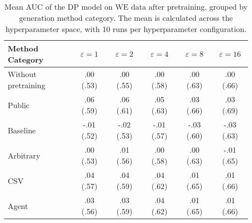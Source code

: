 \begin{table}[h!]
    \centering
    \caption{Mean AUC of the DP model on WE data after pretraining, grouped by generation method category. The mean is calculated across the hyperparameter space, with 10 runs per hyperparameter configuration.}
    \label{tab:epsilon_comparison}
    \begin{tabular}{lccccc}
    \toprule
    Method Category & $\varepsilon=1$ & $\varepsilon=2$ & $\varepsilon=4$ & $\varepsilon=8$ & $\varepsilon=16$ \\
    \midrule
    Without pretraining & .00 {\small (.53)} & .00 {\small (.55)} & .00 {\small (.58)} & .00 {\small (.63)} & .00 {\small (.66)} \\
    \arrayrulecolor{black!50!}\midrule
    Public & \cellcolor{gold!30}.06 {\small (.59)} & \cellcolor{gold!30}.06 {\small (.61)} & \cellcolor{gold!30}.05 {\small (.63)} & \cellcolor{gold!30}.03 {\small (.66)} & \cellcolor{gold!30}.03 {\small (.69)} \\
    \arrayrulecolor{black!50!}\midrule
    Baseline & -.01 {\small (.52)} & -.02 {\small (.53)} & -.01 {\small (.57)} & -.03 {\small (.60)} & -.03 {\small (.63)} \\
    \arrayrulecolor{black!50!}\midrule
    Arbitrary & .00 {\small (.53)} & .01 {\small (.56)} & .00 {\small (.58)} & .00 {\small (.63)} & \cellcolor{bronze!30}-.01 {\small (.65)} \\
    \arrayrulecolor{black!50!}\midrule
    CSV & \cellcolor{silver!30}.04 {\small (.57)} & \cellcolor{silver!30}.04 {\small (.59)} & \cellcolor{silver!30}.04 {\small (.62)} & \cellcolor{bronze!30}.01 {\small (.65)} & \cellcolor{silver!30}.01 {\small (.66)} \\
    Agent & \cellcolor{bronze!30}.03 {\small (.56)} & \cellcolor{bronze!30}.03 {\small (.59)} & \cellcolor{bronze!30}.04 {\small (.62)} & \cellcolor{silver!30}.01 {\small (.65)} & \cellcolor{silver!30}.01 {\small (.66)} \\
    \bottomrule
    \end{tabular}
\end{table}